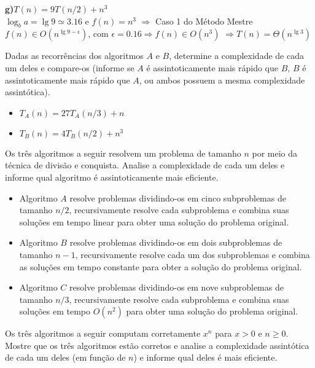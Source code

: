 \documentclass[a4paper]{exam}
\begin{document}
\begin{questions}
\begin{solution}
    \textbf{g)$T(n) = 9T(n/2) + n^3$}\\
      $\log_b a = \lg 9 \simeq 3.16$ e $f(n) = n^3$ $\Rightarrow$  Caso 1 do Método Mestre\\
      $f(n) \in O(n^{\lg 9 - \epsilon})$, com $\epsilon = 0.16 \Rightarrow f(n) \in O(n^3)$
      $\Rightarrow T(n) = \Theta(n^{\lg 3})$
  \end{solution}
  \question Dadas as recorrências dos algoritmos $A$ e
  $B$, determine a complexidade de cada um deles e compare-os
  (informe se $A$ é assintoticamente mais rápido que $B$, $B$
  é assintoticamente mais rápido que $A$, ou ambos possuem a
  mesma complexidade assintótica).
  \begin{itemize}
  \item $T_A(n) = 27T_A(n/3) + n$
  \item $T_B(n) = 4T_B(n/2) + n^3$
  \end{itemize}
  \question Os três algoritmos a seguir resolvem um
  problema de tamanho $n$ por meio da técnica de divisão e conquista.
  Analise a complexidade de cada um deles e informe qual algoritmo é
  assintoticamente mais eficiente.
  \begin{itemize}
  \item Algoritmo $A$ resolve problemas dividindo-os em cinco
    subproblemas de tamanho $n/2$, recursivamente resolve cada
    subproblema e combina suas soluções em tempo linear para obter
    uma solução do problema original.
    \item Algoritmo $B$ resolve problemas dividindo-os em dois
      subproblemas de tamanho $n-1$, recursivamente resolve cada um
      dos subproblemas e combina as soluções em tempo constante para
      obter a solução do problema original.
    \item Algoritmo $C$ resolve problemas dividindo-os em nove 
      subproblemas de tamanho $n/3$, recursivamente resolve cada
      subproblema e combina suas soluções em tempo $O(n^2)$ para obter
      uma solução do problema original.
  \end{itemize}
  \question Os três algoritmos a seguir computam corretamente
  $x^n$ para $x>0$ e $n \geq 0$. Mostre que os três algoritmos estão
  corretos e analise a complexidade assintótica
  de cada um deles (em função de $n$) e informe qual deles é mais
  eficiente.
  \setlength{\algoheightrule}{0pt}
  \setlength{\algotitleheightrule}{0pt}
  \begin{center}
    \vspace{-1cm}
    \begin{minipage}[t][][c]{.25\textwidth}

\end{minipage}
\end{center}
\end{questions}
\end{document}
